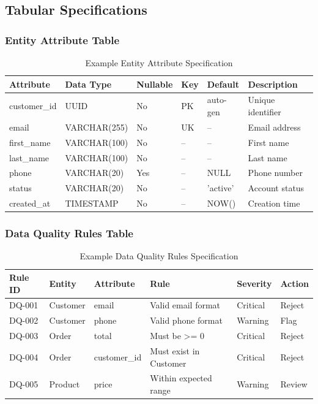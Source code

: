 \documentclass[11pt,letterpaper]{article}
\begin{document}
\subsection{Tabular Specifications}

\subsubsection{Entity Attribute Table}

\begin{table}[H]
\centering
\caption{Example Entity Attribute Specification}
\small
\begin{tabular}{@{}L{2.2cm}L{2.65cm}L{1.5cm}L{1.3cm}L{1.65cm}L{3.2cm}@{}}
\toprule
\textbf{Attribute} & \textbf{Data Type} & \textbf{Nullable} & \textbf{Key} & \textbf{Default} & \textbf{Description} \\
\midrule
customer\_\allowbreak id & UUID & No & PK & auto-gen & Unique identifier \\
email & VARCHAR(255) & No & UK & -- & Email address \\
first\_\allowbreak name & VARCHAR(100) & No & -- & -- & First name \\
last\_\allowbreak name & VARCHAR(100) & No & -- & -- & Last name \\
phone & VARCHAR(20) & Yes & -- & NULL & Phone number \\
status & VARCHAR(20) & No & -- & 'active' & Account status \\
created\_\allowbreak at & TIMESTAMP & No & -- & NOW() & Creation time \\
\bottomrule
\end{tabular}
\end{table}

\subsubsection{Data Quality Rules Table}

\begin{table}[H]
\centering
\caption{Example Data Quality Rules Specification}
\small
\begin{tabular}{@{}L{1.5cm}L{2cm}L{2cm}L{4cm}L{2cm}L{1.5cm}@{}}
\toprule
\textbf{Rule ID} & \textbf{Entity} & \textbf{Attribute} & \textbf{Rule} & \textbf{Severity} & \textbf{Action} \\
\midrule
DQ-001 & Customer & email & Valid email format & Critical & Reject \\
DQ-002 & Customer & phone & Valid phone format & Warning & Flag \\
DQ-003 & Order & total & Must be >= 0 & Critical & Reject \\
DQ-004 & Order & customer\_\allowbreak id & Must exist in Customer & Critical & Reject \\
DQ-005 & Product & price & Within expected range & Warning & Review \\
\bottomrule
\end{tabular}
\end{table}
\end{document}

